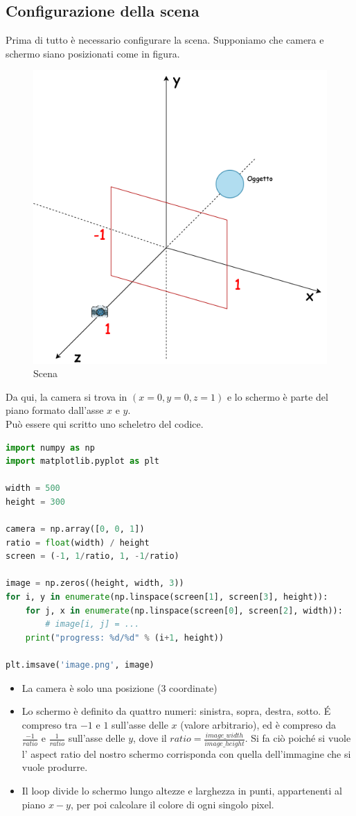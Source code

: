 \documentclass[9pt,a4paper,twoside]{tau}
\begin{document}
\subsection{Configurazione della scena}
Prima di tutto è necessario configurare la scena.
Supponiamo che camera e schermo siano posizionati come in figura.
\begin{figure}[H]
    \centering
    \includegraphics[width=0.7\columnwidth]{Figures/16.png}
    \caption{Scena}
    \label{fig:figure}
\end{figure}
Da qui, la camera si trova in $\left(x=0, y=0, z=1\right)$ e lo schermo è parte del piano formato dall'asse $x$ e $y$.\\
Può essere qui scritto uno scheletro del codice.

\begin{lstlisting}[language=Python]
import numpy as np
import matplotlib.pyplot as plt

width = 500
height = 300

camera = np.array([0, 0, 1])
ratio = float(width) / height
screen = (-1, 1/ratio, 1, -1/ratio)

image = np.zeros((height, width, 3))
for i, y in enumerate(np.linspace(screen[1], screen[3], height)):
    for j, x in enumerate(np.linspace(screen[0], screen[2], width)):
        # image[i, j] = ...
    print("progress: %d/%d" % (i+1, height))

plt.imsave('image.png', image)
\end{lstlisting}

\begin{itemize}
	\item La camera è solo una posizione (3 coordinate)
	\item Lo schermo è definito da quattro numeri: sinistra, sopra, destra, sotto. \'E compreso tra $-1$ e $1$ sull'asse delle $x$ (valore arbitrario), ed è compreso  da $\frac{-1}{ratio}$ e $\frac{1}{ratio}$ sull'asse delle $y$, dove il $ratio = \frac{image\_width}{image\_height}$. Si fa ciò poiché si vuole l' aspect ratio del nostro schermo corrisponda con quella dell'immagine che si vuole produrre.
	\item Il loop divide lo schermo lungo altezze e larghezza in punti, appartenenti al piano $x-y$, per poi calcolare il colore di ogni singolo pixel.
\end{itemize}
\end{document}
